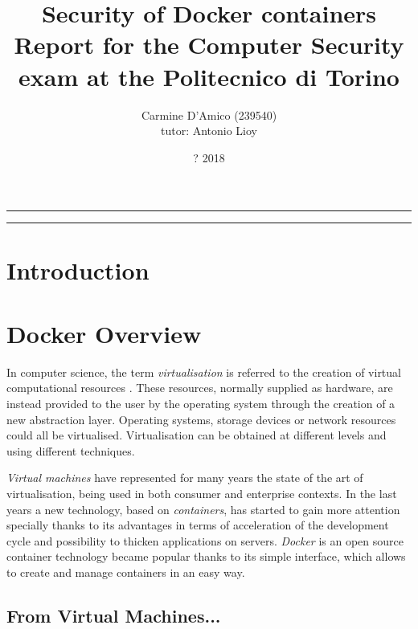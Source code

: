 \documentclass[a4paper,12pt]{article}
\begin{document}
\title{Security of Docker containers \\
{\normalsize Report for the Computer Security exam at the Politecnico di Torino}
} \author{Carmine D'Amico (239540) \\
{\normalsize tutor: Antonio Lioy} }
\date{? 2018}
\maketitle

\vfill

\rule{\textwidth}{1pt}

\tableofcontents

\rule{\textwidth}{1pt}

\vfill

\newpage

\section{Introduction}

\newpage

\section{Docker Overview}

In computer science, the term \textit{virtualisation} is referred to the
creation of virtual computational resources \cite{wikipedia_virtualization}.
These resources, normally supplied as hardware, are instead provided to the user
by the operating system through the creation of a new abstraction layer.
Operating systems, storage devices or network resources could all be
virtualised. Virtualisation can be obtained at different levels and using
different techniques. \par\textit{Virtual machines} have represented for many
years the state of the art of virtualisation, being used in both consumer and
enterprise contexts. In the last years a new technology, based on
\textit{containers}, has started to gain more attention specially thanks to its
advantages in terms of acceleration of the development cycle and possibility to
thicken applications on servers. \textit{Docker} is an open source container
technology became popular thanks to its simple interface, which allows to create
and manage containers in an easy way. 

\subsection{From Virtual Machines...}
\end{document}
